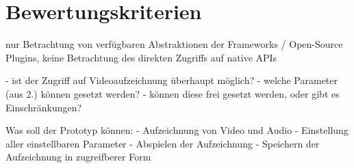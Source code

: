 \chapter{Bewertungskriterien}
\label{ch:Bewertungskriterien}


nur Betrachtung von verfügbaren Abstraktionen der Frameworks / Open-Source Plugins, keine Betrachtung des direkten Zugriffs auf native APIs

- ist der Zugriff auf Videoaufzeichnung überhaupt möglich?
- welche Parameter (aus 2.) können gesetzt werden?
  - können diese frei gesetzt werden, oder gibt es Einschränkungen?

Was soll der Prototyp können:
  - Aufzeichnung von Video und Audio
    - Einstellung aller einstellbaren Parameter
  - Abspielen der Aufzeichnung
  - Speichern der Aufzeichnung in zugreifberer Form